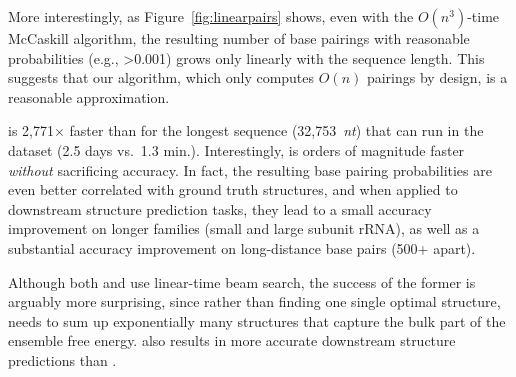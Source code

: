 More interestingly, as Figure~\ref{fig:linearpairs} shows,
even with the $O(n^3)$-time McCaskill algorithm, %
the resulting number of base pairings with reasonable probabilities (e.g., >0.001)
grows only linearly with the sequence length.
This suggests that our algorithm, which only computes $O(n)$ pairings by design,
is a reasonable approximation.


\linearpartition is 2,771$\times$ faster than \contrafold for the longest sequence (32,753~{\it nt})
that \contrafold can run 
in the dataset (2.5 days vs.~1.3 min.).
Interestingly, \linearpartition is orders of magnitude faster {\em without} sacrificing accuracy.
In fact, the resulting base pairing probabilities are even better correlated with ground truth structures,
and 
when applied to downstream structure prediction tasks,
they lead to a small accuracy improvement on longer families (small and large subunit rRNA),
as well as a substantial accuracy improvement on long-distance base pairs (500+ \nts apart).


Although both \linearpartition and \linearfold use linear-time beam search,
the success of the former is arguably more surprising,
since rather than finding one single optimal structure, 
\linearpartition needs to sum up exponentially many structures
that capture the bulk part of the ensemble free energy.
\linearpartition also results in more accurate downstream structure predictions than \linearfold.



